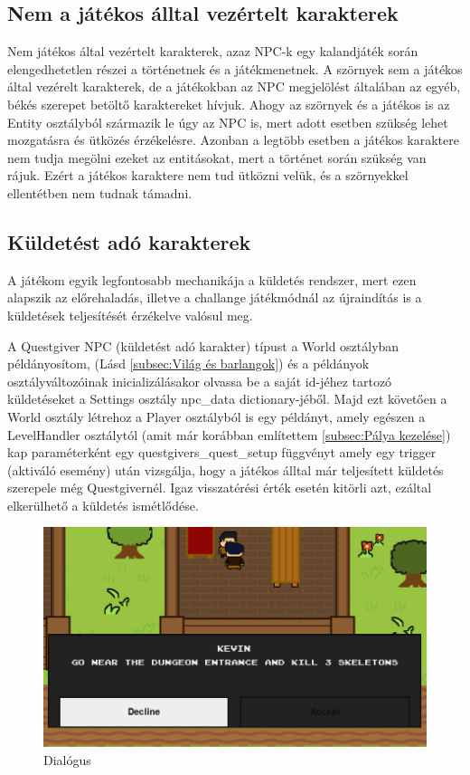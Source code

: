 \subsection{Nem a játékos álltal vezértelt karakterek}
 Nem játékos által vezértelt karakterek, azaz NPC-k egy kalandjáték során elengedhetetlen részei a történetnek és a játékmenetnek. A szörnyek sem a játékos által vezérelt karakterek, de a játékokban az NPC megjelölést általában az egyéb, békés szerepet betöltő karaktereket hívjuk. Ahogy az szörnyek és a játékos is az Entity osztályból származik le úgy az NPC is, mert adott esetben szükség lehet mozgatásra és ütközés érzékelésre. Azonban a legtöbb esetben a játékos karaktere nem tudja megölni ezeket az entitásokat, mert a történet során szükség van rájuk. Ezért a játékos karaktere nem tud ütközni velük, és a szörnyekkel ellentétben nem tudnak támadni.


\subsection{Küldetést adó karakterek}

 A játékom egyik legfontosabb mechanikája a küldetés rendszer, mert ezen alapszik az előrehaladás, illetve a challange játékmódnál az újraindítás is a küldetések teljesítését érzékelve valósul meg. 

A Questgiver NPC (küldetést adó karakter) típust a World osztályban példányosítom, (Lásd \ref{subsec:Világ és barlangok}) és
 a példányok osztályváltozóinak inicializálásakor olvassa be a saját id-jéhez tartozó küldetéseket a Settings osztály npc\_data dictionary-jéből.
  Majd ezt követően a World osztály létrehoz a Player osztályból is egy példányt,
   amely egészen a LevelHandler osztálytól (amit már korábban említettem \ref{subsec:Pálya kezelése}) kap
    paraméterként egy questgivers\_quest\_setup függvényt amely egy trigger (aktiváló esemény) után vizsgálja,
     hogy a játékos álltal már teljesített küldetés szerepel\-e még Questgivernél. Igaz visszatérési érték esetén kitörli azt,
      ezáltal elkerülhető a küldetés ismétlődése. 
       \begin{figure}[H]
        \centering
        \includegraphics[width=12.0truecm]{images/dialogue.png}
        \caption{Dialógus}
        \label{fig:Dialógus rendszer}
    \end{figure}
    
